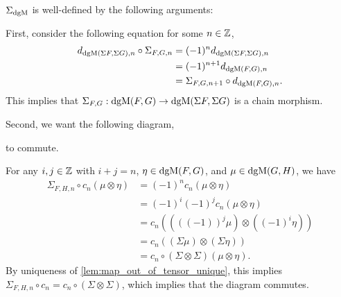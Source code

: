 \begin{remark}
    \( \Sigma_{\operatorname{dgM}} \) is well-defined by the following arguments:

    First, consider the following equation for some \( n \in {\mathbb{Z}} \),
    \begin{align*}
        d_{\operatorname{dgM}(\Sigma F, \Sigma G), n} \circ \Sigma_{F, G, n} &= (-1)^n d_{\operatorname{dgM}(\Sigma F, \Sigma G), n} \\
        &= (-1)^{n + 1} d_{\operatorname{dgM}(F, G), n} \\
        &= \Sigma_{F, G, n + 1} \circ d_{\operatorname{dgM}(F, G), n}.
    \end{align*}
    This implies that \( \Sigma_{F, G}: \operatorname{dgM}(F, G) \to \operatorname{dgM}(\Sigma F, \Sigma G) \) is a chain morphism.

    Second, we want the following diagram,
    \begin{center}
    \end{center}
    to commute.
    
    For any \( i, j \in {\mathbb{Z}} \) with \( i + j = n \), \( \eta \in \operatorname{dgM}(F, G) \), and \( \mu \in \operatorname{dgM}(G, H) \), we have
    \begin{align*}
        \Sigma_{F, H, n} \circ c_n (\mu \otimes \eta) &= (-1)^n c_n (\mu \otimes \eta) \\
        &= (-1)^i (-1)^j c_n (\mu \otimes \eta) \\
        &= c_n ((((-1))^j \mu) \otimes ((-1)^i \eta)) \\
        &= c_n ((\Sigma \mu) \otimes (\Sigma \eta)) \\
        &= c_n \circ (\Sigma \otimes \Sigma) (\mu \otimes \eta).
    \end{align*}
    By uniqueness of \autoref{lem:map_out_of_tensor_unique}, this implies \( \Sigma_{F, H, n} \circ c_n = c_n \circ (\Sigma \otimes \Sigma) \), which implies that the diagram commutes.


\end{remark}
